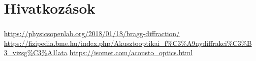 \documentclass[aspectratio=169]{beamer}
\begin{document}
\section{Hivatkozások}
\begin{frame}
\frametitle{\secname}
\begin{thebibliography}{99}
\footnotesize
{} \url{https://physicsopenlab.org/2018/01/18/bragg-diffraction/}
 \url{https://fizipedia.bme.hu/index.php/Akusztooptikai_f\%C3\%A9nydiffrakci\%C3\%B3_vizsg\%C3\%A1lata}
 \url{https://isomet.com/acousto_optics.html}
\end{thebibliography}
\end{frame}
\end{document}
